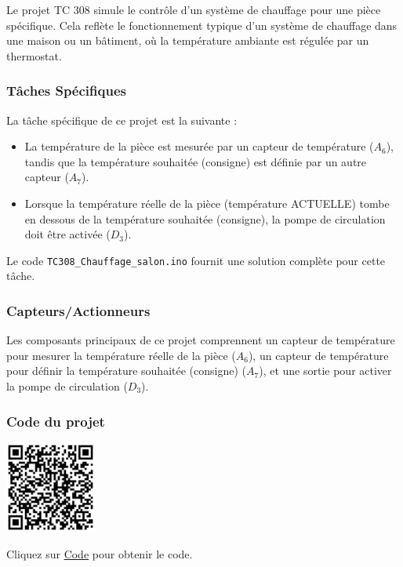 \documentclass[a4paper,12pt]{report}
\begin{document}
Le projet TC 308 simule le contrôle d'un système de chauffage pour une pièce spécifique. Cela reflète le fonctionnement typique d'un système de chauffage dans une maison ou un bâtiment, où la température ambiante est régulée par un thermostat.

\subsubsection{Tâches Spécifiques}

La tâche spécifique de ce projet est la suivante :
\begin{itemize}
    \item La température de la pièce est mesurée par un capteur de température (\(A_6\)), tandis que la température souhaitée (consigne) est définie par un autre capteur (\(A_7\)).
    \item Lorsque la température réelle de la pièce (température ACTUELLE) tombe en dessous de la température souhaitée (consigne), la pompe de circulation doit être activée (\(D_3\)).
\end{itemize}
Le code \texttt{TC308\_Chauffage\_salon.ino} fournit une solution complète pour cette tâche.

\subsubsection{Capteurs/Actionneurs}

Les composants principaux de ce projet comprennent un capteur de température pour mesurer la température réelle de la pièce (\(A_6\)), un capteur de température pour définir la température souhaitée (consigne) (\(A_7\)), et une sortie pour activer la pompe de circulation (\(D_3\)).

\subsubsection{Code du projet}

\begin{minipage}{0.5\textwidth}
    \includegraphics[height=3cm]{Code TC308.png}
\end{minipage}%
\begin{minipage}{0.5\textwidth}
    Cliquez sur \href{https://github.com/DexterTaha/Controllino-PLC-Sample/blob/main/TC300/TC308_Chauffage_salon/TC308_Chauffage_salon.ino}{Code} pour obtenir le code.
\end{minipage}
\end{document}
